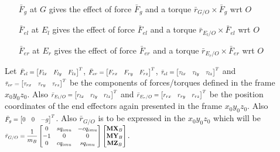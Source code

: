 \documentclass[a4paper,10pt]{article}
\newcommand\scalemath[2]{\scalebox{#1}{\mbox{\ensuremath{\displaystyle #2}}}}
\begin{document}
\begin{itemize}[label={}]
 \item[$\bar{F}_g$] at $G$ gives the effect of force $\bar{F}_g$ and a torque $\bar{r}_{G/O} \times \bar{F}_g$ wrt $O$
 \item[$\bar{F}_{el}$] at $E_l$ gives the effect of force $\bar{F}_{el}$ and a torque $\bar{r}_{E_l/O} \times \bar{F}_{el}$ wrt $O$
 \item[$\bar{F}_{er}$] at $E_r$ gives the effect of force $\bar{F}_{er}$ and a torque $\bar{r}_{E_r/O} \times \bar{F}_{er}$ wrt $O$
\end{itemize}

Let $\scalemath{0.75}{\bar{F}_{el} = \left[\begin{matrix} F_{lx} & F_{ly} & F_{lz} \end{matrix}\right]^T}$, 
$\scalemath{0.75}{\bar{F}_{er} = \left[\begin{matrix} F_{rx} & F_{ry} & F_{rz} \end{matrix}\right]^T}$,
$\scalemath{0.75}{\bar{\tau}_{el} = \left[\begin{matrix} \tau_{lx} & \tau_{ly} & \tau_{lz} \end{matrix}\right]^T}$ and
$\scalemath{0.75}{\bar{\tau}_{er} = \left[\begin{matrix} \tau_{rx} & \tau_{ry} & \tau_{rz} \end{matrix}\right]^T}$ 
be the components of forces/torques defined in the frame $x_0y_0z_0$. Also
$\scalemath{0.75}{\bar{r}_{E_l/O} = \left[\begin{matrix} r_{lx} & r_{ly} & r_{lz} \end{matrix}\right]^T}$ and
$\scalemath{0.75}{\bar{r}_{E_r/O} = \left[\begin{matrix} r_{rx} & r_{ry} & r_{rz} \end{matrix}\right]^T}$ be the
position coordinates of the end effectors again presented in the frame $x_0y_0z_0$. Also 
$\scalemath{0.75}{\bar{F}_{g} = \left[\begin{matrix} 0 & 0 & -g \end{matrix}\right]^T}$.
Also $\bar{r}_{G/O}$ is to be expressed in the $x_0y_0z_0$ which will be
$\scalemath{0.75}{\bar{r}_{G/O} = \frac{1}{m_B}\left[\begin{matrix} 0 & sq_{imu} & -cq_{imu} \\ -1 & 0 & 0 \\ 0 & cq_{imu} & sq_{imu} \end{matrix}\right]
\left[\begin{matrix} \mathbf{MX}_{B} \\ \mathbf{MY}_{B} \\ \mathbf{MZ}_{B} \end{matrix}\right]}$.
\end{document}
